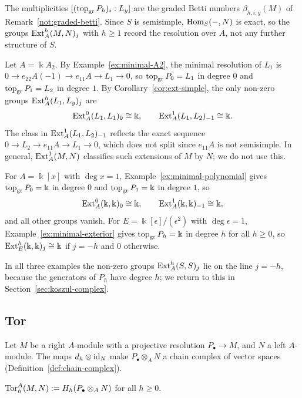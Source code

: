 The multiplicities $[(\operatorname{top}\nolimits_{\mathrm{gr}} P_h)_i:L_y]$ are the graded Betti numbers $\beta_{h,i,y}(M)$ of Remark~\ref{not:graded-betti}.
Since $S$ is semisimple, $\operatorname{Hom}\nolimits_S(-,N)$ is exact, so the groups $\operatorname{Ext}\nolimits_A^h(M,N)_j$ with $h\geq1$ record the resolution over $A$, not any further structure of $S$.

\begin{example}\label{ex:ext-A2}
Let $A=\Bbbk A_2$.
By Example~\ref{ex:minimal-A2}, the minimal resolution of $L_1$ is $0\to e_{22}A(-1)\to e_{11}A\to L_1\to0$, so $\operatorname{top}\nolimits_{\mathrm{gr}} P_0=L_1$ in degree $0$ and $\operatorname{top}\nolimits_{\mathrm{gr}} P_1=L_2$ in degree $1$.
By Corollary~\ref{cor:ext-simple}, the only non-zero groups $\operatorname{Ext}\nolimits_A^h(L_1,L_y)_j$ are
\[
\operatorname{Ext}\nolimits_A^0(L_1,L_1)_0\cong\Bbbk,\qquad\operatorname{Ext}\nolimits_A^1(L_1,L_2)_{-1}\cong\Bbbk.
\]
The class in $\operatorname{Ext}\nolimits_A^1(L_1,L_2)_{-1}$ reflects the exact sequence $0\to L_2\to e_{11}A\to L_1\to0$, which does not split since $e_{11}A$ is not semisimple.
In general, $\operatorname{Ext}\nolimits_A^1(M,N)$ classifies such extensions of $M$ by $N$; we do not use this.
\end{example}

\begin{example}\label{ex:ext-polynomial-exterior}
For $A=\Bbbk[x]$ with $\deg x=1$, Example~\ref{ex:minimal-polynomial} gives $\operatorname{top}\nolimits_{\mathrm{gr}} P_0=\Bbbk$ in degree $0$ and $\operatorname{top}\nolimits_{\mathrm{gr}} P_1=\Bbbk$ in degree $1$, so
\[
\operatorname{Ext}\nolimits_A^0(\Bbbk,\Bbbk)_0\cong\Bbbk,\qquad\operatorname{Ext}\nolimits_A^1(\Bbbk,\Bbbk)_{-1}\cong\Bbbk,
\]
and all other groups vanish.
For $E=\Bbbk[\epsilon]/(\epsilon^2)$ with $\deg\epsilon=1$, Example~\ref{ex:minimal-exterior} gives $\operatorname{top}\nolimits_{\mathrm{gr}} P_h=\Bbbk$ in degree $h$ for all $h\geq0$, so $\operatorname{Ext}\nolimits_E^h(\Bbbk,\Bbbk)_j\cong\Bbbk$ if $j=-h$ and $0$ otherwise.
\end{example}

In all three examples the non-zero groups $\operatorname{Ext}\nolimits_A^h(S,S)_j$ lie on the line $j=-h$, because the generators of $P_h$ have degree $h$; we return to this in Section~\ref{sec:koszul-complex}.

\subsection{Tor}

Let $M$ be a right $A$-module with a projective resolution $P_\bullet\to M$, and $N$ a left $A$-module.
The maps $d_h\otimes\operatorname{id}_N$ make $P_\bullet\otimes_AN$ a chain complex of vector spaces (Definition~\ref{def:chain-complex}).

\begin{definition}\label{def:tor}
$\operatorname{Tor}\nolimits_h^A(M,N):=H_h(P_\bullet\otimes_AN)$ for all $h\geq0$.
\end{definition}

